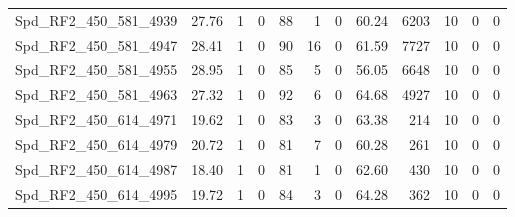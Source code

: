\begin{longtable}[c]{@{}lrrrrrrrrrrr@{}}
Spd\_RF2\_450\_581\_4939     & 27.76                  & 1                       & 0                       & 88                     & 1                       & 0                       & 60.24                   & 6203                     & 10                       & 0                        & 0                        \\
Spd\_RF2\_450\_581\_4947     & 28.41                  & 1                       & 0                       & 90                     & 16                      & 0                       & 61.59                   & 7727                     & 10                       & 0                        & 0                        \\
Spd\_RF2\_450\_581\_4955     & 28.95                  & 1                       & 0                       & 85                     & 5                       & 0                       & 56.05                   & 6648                     & 10                       & 0                        & 0                        \\
Spd\_RF2\_450\_581\_4963     & 27.32                  & 1                       & 0                       & 92                     & 6                       & 0                       & 64.68                   & 4927                     & 10                       & 0                        & 0                        \\
Spd\_RF2\_450\_614\_4971     & 19.62                  & 1                       & 0                       & 83                     & 3                       & 0                       & 63.38                   & 214                      & 10                       & 0                        & 0                        \\
Spd\_RF2\_450\_614\_4979     & 20.72                  & 1                       & 0                       & 81                     & 7                       & 0                       & 60.28                   & 261                      & 10                       & 0                        & 0                        \\
Spd\_RF2\_450\_614\_4987     & 18.40                  & 1                       & 0                       & 81                     & 1                       & 0                       & 62.60                   & 430                      & 10                       & 0                        & 0                        \\
Spd\_RF2\_450\_614\_4995     & 19.72                  & 1                       & 0                       & 84                     & 3                       & 0                       & 64.28                   & 362                      & 10                       & 0                        & 0                        \\

\end{longtable}
